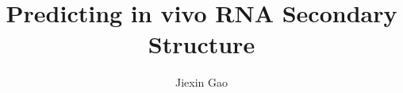\documentclass{proposal}
\author{Jiexin Gao}
\title{Predicting in vivo RNA Secondary Structure}
\begin{document}
\begin{preliminary}

\maketitle

\begin{abstract}

    \cite{rouskin2014genome}

\end{abstract}

\tableofcontents

\end{preliminary}






\end{document}
